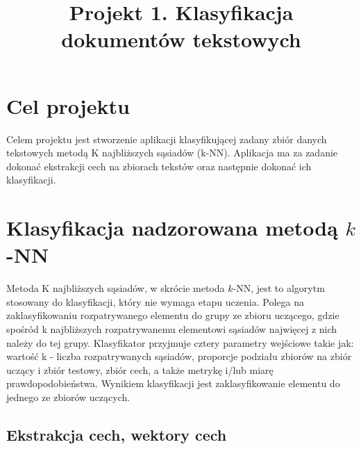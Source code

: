 \documentclass{classrep}
\author{
  \studentinfo{Julia Szymańska}{224441} \and
  \studentinfo{Przemysław Zdrzalik}{224466} }
\title{Projekt 1. Klasyfikacja dokumentów tekstowych}
\begin{document}
\maketitle


\section{Cel projektu}

Celem projektu jest stworzenie aplikacji klasyfikującej zadany zbiór danych tekstowych metodą K najbliższych sąsiadów (k-NN). Aplikacja ma za zadanie dokonać ekstrakcji cech na zbiorach tekstów\cite{dane} oraz następnie dokonać ich klasyfikacji.\\


\section{Klasyfikacja nadzorowana metodą $k$-NN}

Metoda K najbliższych sąsiadów, w skrócie metoda $k$-NN\cite{dane}, jest to algorytm stosowany do klasyfikacji, który nie wymaga etapu uczenia. 
Polega na zaklasyfikowaniu rozpatrywanego elementu do grupy ze zbioru uczącego, gdzie spośród k najbliższych rozpatrywanemu elementowi sąsiadów najwięcej z nich należy do tej grupy. Klasyfikator przyjmuje cztery parametry wejściowe takie jak: wartość k - liczba rozpatrywanych sąsiadów, proporcje podziału zbiorów na zbiór uczący i zbiór testowy, zbiór cech, a także metrykę i/lub miarę prawdopodobieństwa. Wynikiem klasyfikacji jest zaklasyfikowanie elementu do jednego ze zbiorów uczących. 


\subsection{Ekstrakcja cech, wektory cech}
\end{document}
